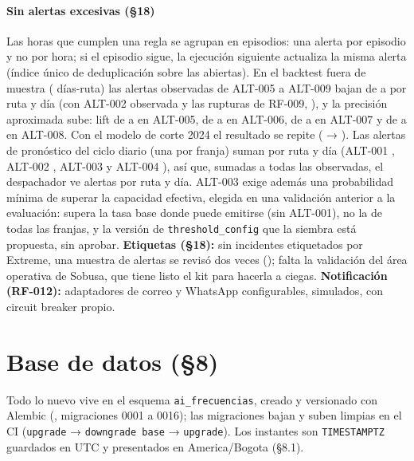 \documentclass[10pt,a4paper]{article}
\begin{document}
\paragraph{Sin alertas excesivas (§18)} Las horas que cumplen una regla se agrupan en episodios: una alerta por episodio
y no por hora; si el episodio sigue, la ejecución siguiente actualiza la misma alerta (índice único de deduplicación
sobre las abiertas). En el backtest fuera de muestra (\DiasRuta{} días-ruta) las alertas observadas de ALT-005 a
ALT-009 bajan de \AlertasAntes{} a \AlertasAhora{} por ruta y día (con ALT-002 observada y las rupturas de RF-009,
\AlertasObsTodas), y la precisión aproximada sube: lift de \LiftAntesCinco{} a
\LiftCinco{} en ALT-005, de \LiftAntesSeis{} a \LiftSeis{} en ALT-006, de \LiftAntesSiete{} a \LiftSiete{} en ALT-007 y
de \LiftAntesOcho{} a \LiftOcho{} en ALT-008. Con el modelo de corte 2024 el resultado se repite
(\AlertasAntesDosmil{} → \AlertasAhoraDosmil). Las alertas de pronóstico del ciclo diario (una por franja) suman
\AlertasPronostico{} por ruta y día (ALT-001 \AlertasPronUno, ALT-002 \AlertasPronDos, ALT-003 \AlertasPronTres{} y
ALT-004 \AlertasPronCuatro), así que, sumadas a todas las observadas, el despachador ve \AlertasTotal{} alertas por
ruta y día. ALT-003 exige además una probabilidad mínima de superar la capacidad efectiva, elegida en una validación
anterior a la evaluación: supera la tasa base donde puede emitirse (sin ALT-001), no la de todas las franjas, y la
versión de \texttt{threshold\_config} que la siembra está propuesta, sin aprobar.
 \textbf{Etiquetas (§18):} sin incidentes
etiquetados por Extreme, una muestra de alertas se revisó dos veces (\RevisionDoble); falta la validación del área
operativa de Sobusa, que tiene listo el kit para hacerla a ciegas.
 \textbf{Notificación (RF-012):}
adaptadores de correo y WhatsApp configurables, simulados, con circuit breaker propio.

\section{Base de datos (§8)}
\label{sec:bd}
Todo lo nuevo vive en el esquema \texttt{ai\_frecuencias}, creado y versionado con Alembic
(, migraciones 0001 a 0016); las migraciones bajan y suben limpias en el CI (\texttt{upgrade}
→ \texttt{downgrade base} → \texttt{upgrade}). Los instantes son \texttt{TIMESTAMPTZ} guardados en UTC y presentados en America/Bogota (§8.1).
\end{document}
